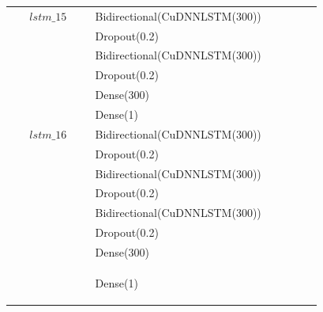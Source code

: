 \begin{longtable}{| c | m{0.58\linewidth} | r | m{0.1\linewidth} |}
    $lstm\_15$  & Bidirectional(CuDNNLSTM(300)) \\
                & Dropout(0.2)                  \\
                & Bidirectional(CuDNNLSTM(300)) \\
                & Dropout(0.2)                  \\
                & Dense(300)                    \\
                & Dense(1)                      \\ \hline

    $lstm\_16$  & Bidirectional(CuDNNLSTM(300)) \\
                & Dropout(0.2)                  \\
                & Bidirectional(CuDNNLSTM(300)) \\
                & Dropout(0.2)                  \\
                & Bidirectional(CuDNNLSTM(300)) \\
                & Dropout(0.2)                  \\
                & Dense(300)                    \\
                & Dense(1)                      %



    \label{table:sieci}
\end{longtable}



